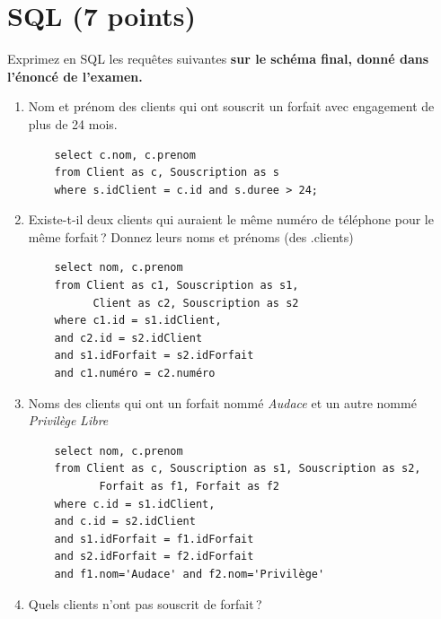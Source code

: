\section{SQL (7 points)}

Exprimez en SQL les requêtes suivantes \textbf{sur le schéma final, donné dans l'énoncé de l'examen.}

\begin{enumerate}

\item Nom et prénom des clients qui ont souscrit un forfait avec engagement de plus de 24 mois.

\begin{solution}
	\begin{verbatim}
	select c.nom, c.prenom
	from Client as c, Souscription as s
	where s.idClient = c.id and s.duree > 24;
	\end{verbatim}
\end{solution}

\item Existe-t-il deux clients qui auraient le même numéro de téléphone pour le même forfait\,?
Donnez leurs noms et prénoms (des .clients)

\begin{solution}
	\begin{verbatim}
	select nom, c.prenom
	from Client as c1, Souscription as s1,
	      Client as c2, Souscription as s2
	where c1.id = s1.idClient,
	and c2.id = s2.idClient
	and s1.idForfait = s2.idForfait
	and c1.numéro = c2.numéro
	\end{verbatim}
\end{solution}


\item Noms des clients qui ont un forfait nommé \emph{Audace} et un autre nommé   \emph{Privilège}
     \emph{Libre}


\begin{solution}
	\begin{verbatim}
	select nom, c.prenom
	from Client as c, Souscription as s1, Souscription as s2,
	       Forfait as f1, Forfait as f2
	where c.id = s1.idClient,
	and c.id = s2.idClient
	and s1.idForfait = f1.idForfait
	and s2.idForfait = f2.idForfait
	and f1.nom='Audace' and f2.nom='Privilège'
	\end{verbatim}
\end{solution}

 \item Quels clients n'ont pas souscrit de forfait\,?


\end{enumerate}

